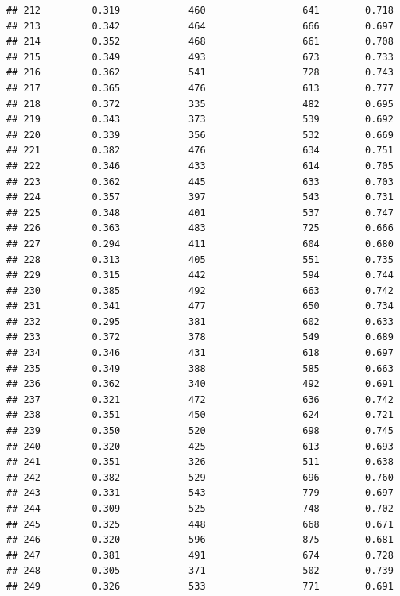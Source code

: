 \documentclass[]{book}
\begin{document}
\begin{verbatim}
## 212         0.319            460                 641        0.718
## 213         0.342            464                 666        0.697
## 214         0.352            468                 661        0.708
## 215         0.349            493                 673        0.733
## 216         0.362            541                 728        0.743
## 217         0.365            476                 613        0.777
## 218         0.372            335                 482        0.695
## 219         0.343            373                 539        0.692
## 220         0.339            356                 532        0.669
## 221         0.382            476                 634        0.751
## 222         0.346            433                 614        0.705
## 223         0.362            445                 633        0.703
## 224         0.357            397                 543        0.731
## 225         0.348            401                 537        0.747
## 226         0.363            483                 725        0.666
## 227         0.294            411                 604        0.680
## 228         0.313            405                 551        0.735
## 229         0.315            442                 594        0.744
## 230         0.385            492                 663        0.742
## 231         0.341            477                 650        0.734
## 232         0.295            381                 602        0.633
## 233         0.372            378                 549        0.689
## 234         0.346            431                 618        0.697
## 235         0.349            388                 585        0.663
## 236         0.362            340                 492        0.691
## 237         0.321            472                 636        0.742
## 238         0.351            450                 624        0.721
## 239         0.350            520                 698        0.745
## 240         0.320            425                 613        0.693
## 241         0.351            326                 511        0.638
## 242         0.382            529                 696        0.760
## 243         0.331            543                 779        0.697
## 244         0.309            525                 748        0.702
## 245         0.325            448                 668        0.671
## 246         0.320            596                 875        0.681
## 247         0.381            491                 674        0.728
## 248         0.305            371                 502        0.739
## 249         0.326            533                 771        0.691

\end{verbatim}
\end{document}
